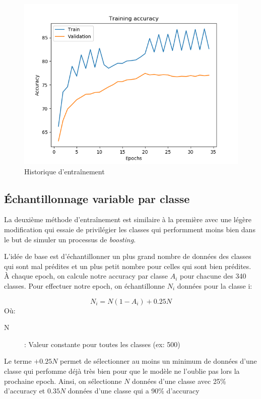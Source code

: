 \begin{figure}[h]
	\includegraphics[width=\linewidth]{images/Model_general.png} %
	\caption{Historique d'entraînement} %
	\label{histmodelnormal} 
\end{figure}


\subsection{Échantillonnage variable par classe}
La deuxième méthode d'entraînement est similaire à la première avec une légère modification qui essaie de privilégier les classes qui performment moins bien dans le but de simuler un processus de \emph{boosting}.


L'idée de base est d'échantillonner un plus grand nombre de données des classes qui sont mal prédites et un plus petit nombre pour celles qui sont bien prédites. À chaque epoch, on calcule notre accuracy par classe $A_i$ pour chacune des 340 classes. Pour effectuer notre epoch, on échantillonne $N_i$ données pour la classe i:

$$N_i=N(1-A_i)+0.25N$$
Où:
\begin{description}
\item[N]: Valeur constante pour toutes les classes (ex: 500)
\end{description}

Le terme $+0.25N$ permet de sélectionner au moins un minimum de données d'une classe qui perfomme déjà très bien pour que le modèle ne l'oublie pas lors la prochaine epoch.  Ainsi, on sélectionne $N$ données d'une classe avec 25\% d'accuracy et $0.35N$ données d'une classe qui a 90\% d'accuracy


